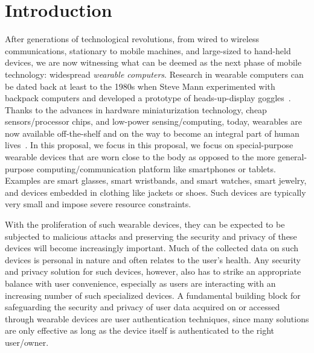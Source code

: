 \section{Introduction}\label{sec:intro}
After generations of technological revolutions, from wired to wireless communications, stationary to mobile machines, and large-sized to hand-held devices, we are now witnessing what can be deemed as the
next phase of mobile technology: widespread {\em wearable computers}. Research in
wearable computers can be dated back at least to the 1980s when Steve Mann
experimented with backpack computers and developed a prototype of heads-up-display goggles~\cite{mann1997wearable}. Thanks to the advances in hardware miniaturization technology, cheap sensors/processor
chips, and low-power sensing/computing, today, wearables are now available
off-the-shelf and on the way to become an integral part of human
lives~\cite{googleglass,smartwatch,fitbit}. In this proposal, we focus in this proposal, we focus on special-purpose wearable devices that are worn close to the body as opposed to the more general-purpose computing/communication platform like smartphones or tablets. Examples are smart glasses, smart wristbands, and smart watches, smart jewelry, and devices embedded in clothing like jackets or shoes. Such devices are typically very small and impose severe resource constraints.

With the proliferation of such wearable devices, they can be expected to be subjected to malicious attacks and preserving the security and privacy of these devices will become increasingly important.
Much of the collected data on such devices is personal in nature and often relates to the user's health. Any security and privacy solution for such devices, however, also has to strike an appropriate balance with user convenience, especially as users are interacting with an increasing number of such specialized devices. A fundamental building block for safeguarding the security and privacy of user data acquired on or accessed through wearable devices are user authentication techniques, since many solutions are only effective as long as the device itself is authenticated to the right user/owner.

